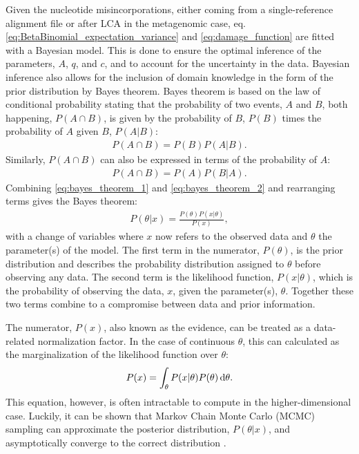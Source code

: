 Given the nucleotide misincorporations, either coming from a single-reference alignment file or after LCA in the metagenomic case, eq. \eqref{eq:BetaBinomial_expectation_variance} and \eqref{eq:damage_function} are fitted with a Bayesian model. This is done to ensure the optimal inference of the parameters, $A$, $q$, and $c$, and to account for the uncertainty in the data. Bayesian inference also allows for the inclusion of domain knowledge in the form of the prior distribution by Bayes theorem. Bayes theorem is based on the law of conditional probability \autocite{barlowStatisticsGuideUse1993} stating that the probability of two events, $A$ and $B$, both happening, $P(A \cap B)$, is given by the probability of $B$, $P(B)$ times the probability of $A$ given $B$, $P(A|B)$:
\begin{align}
    P(A \cap B) = P(B)P(A|B).
    \label{eq:bayes_theorem_1}
\end{align}
Similarly, $P(A \cap B)$ can also be expressed in terms of the probability of $A$:
\begin{align}
    P(A \cap B) = P(A)P(B|A).
    \label{eq:bayes_theorem_2}
\end{align}
Combining \autoref{eq:bayes_theorem_1} and \autoref{eq:bayes_theorem_2} and rearranging terms gives the Bayes theorem:
\begin{align}
    P(\theta|x) = \frac{P(\theta)P(x|\theta)}{P(x)},
    \label{eq:bayes_theorem}
\end{align}
with a change of variables where $x$ now refers to the observed data and $\theta$ the parameter(s) of the model. The first term in the numerator, $P(\theta)$, is the prior distribution and describes the probability distribution assigned to $\theta$ before observing any data. The second term is the likelihood function, $P(x|\theta)$, which is the probability of observing the data, $x$, given the parameter(s), $\theta$. Together these two terms combine to a compromise between data and prior information.

The numerator, $P(x)$, also known as the evidence, can be treated as a data-related normalization factor. In the case of continuous $\theta$, this can calculated as the marginalization of the likelihood function over $\theta$:
\begin{align}
    P(x) = \int_\theta P(x|\theta)P(\theta) \mathop{}\!\mathrm{d} \theta.
    \label{eq:evidence}
\end{align}
This equation, however, is often intractable to compute in the higher-dimensional case. Luckily, it can be shown that Markov Chain Monte Carlo (MCMC) sampling can approximate the posterior distribution, $P(\theta|x)$, and asymptotically converge to the correct distribution \autocite{gelmanBayesianDataAnalysis2015a}.

